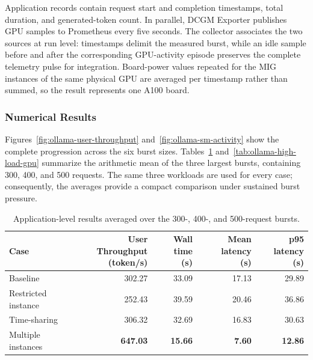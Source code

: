 Application records contain request start and completion timestamps, total duration, and generated-token count. In parallel, DCGM Exporter publishes GPU samples to Prometheus every five seconds. The collector associates the two sources at run level: timestamps delimit the measured burst, while an idle sample before and after the corresponding GPU-activity episode preserves the complete telemetry pulse for integration. Board-power values repeated for the MIG instances of the same physical GPU are averaged per timestamp rather than summed, so the result represents one A100 board.

\subsubsection{Numerical Results}

Figures~\ref{fig:ollama-user-throughput} and~\ref{fig:ollama-sm-activity} show the complete progression across the six burst sizes. Tables~\ref{tab:ollama-high-load-performance} and~\ref{tab:ollama-high-load-gpu} summarize the arithmetic mean of the three largest bursts, containing 300, 400, and 500 requests. The same three workloads are used for every case; consequently, the averages provide a compact comparison under sustained burst pressure.

\begin{table}[htbp]
    \centering
    \small
    \caption{Application-level results averaged over the 300-, 400-, and 500-request bursts.}
    \label{tab:ollama-high-load-performance}
    \begin{tabular}{lrrrr}
        \toprule
        \textbf{Case} & \makecell{\textbf{User Throughput}\\\textbf{(token/s)}} & \makecell{\textbf{Wall time}\\\textbf{(s)}} & \makecell{\textbf{Mean latency}\\\textbf{(s)}} & \makecell{\textbf{p95 latency}\\\textbf{(s)}} \\
        \midrule
        Baseline & 302.27 & 33.09 & 17.13 & 29.89 \\
        Restricted instance & 252.43 & 39.59 & 20.46 & 36.86 \\
        Time-sharing & 306.32 & 32.69 & 16.83 & 30.63 \\
        Multiple instances & \textbf{647.03} & \textbf{15.66} & \textbf{7.60} & \textbf{12.86} \\
        \bottomrule
    \end{tabular}
\end{table}

